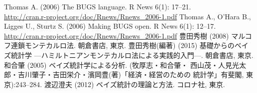 \documentclass[11pt,uplatex]{jsarticle}
\begin{document}
\begin{thebibliography}{99}
 Thomas A. (2006) The BUGS language.
  R News 6(1): 17--21. \\
  \url{http://cran.r-project.org/doc/Rnews/Rnews_2006-1.pdf}
 Thomas A., O'Hara B., Ligges U., Sturtz S. (2006) Making BUGS open.
  R News 6(1): 12--17. \\
  \url{http://cran.r-project.org/doc/Rnews/Rnews_2006-1.pdf}
 豊田秀樹 (2008) マルコフ連鎖モンテカルロ法. 朝倉書店, 東京.
 豊田秀樹(編著) (2015) 基礎からのベイズ統計学
  ---ハミルトニアンモンテカルロ法による実践的入門---. 朝倉書店, 東京.
 和合肇 (2005) ベイズ統計学による分析. (牧厚志・和合肇・
  西山茂・人見光太郎・吉川肇子・吉田栄介・濱岡豊(著)「経済・経営のための
  統計学」有斐閣, 東京):243--284.
 渡辺澄夫 (2012) ベイズ統計の理論と方法. コロナ社, 東京.
\end{thebibliography}
\end{document}
